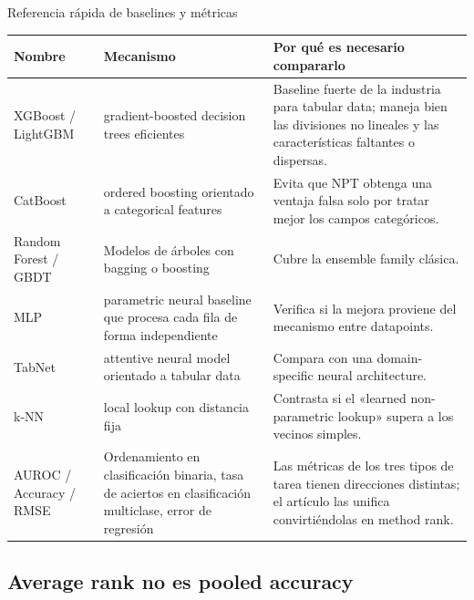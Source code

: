 \documentclass[a4paper]{article}
\begin{document}
\begin{knowledgebox}{Referencia rápida de baselines y métricas}
\begin{tabularx}{\textwidth}{L{0.19\textwidth}L{0.25\textwidth}>{\raggedright\arraybackslash}X}
\toprule
Nombre & Mecanismo & Por qué es necesario compararlo \\
\midrule
XGBoost / LightGBM & gradient-boosted decision trees eficientes & Baseline fuerte de la industria para tabular data; maneja bien las divisiones no lineales y las características faltantes o dispersas. \\
CatBoost & ordered boosting orientado a categorical features & Evita que NPT obtenga una ventaja falsa solo por tratar mejor los campos categóricos. \\
Random Forest / GBDT & Modelos de árboles con bagging o boosting & Cubre la ensemble family clásica. \\
MLP & parametric neural baseline que procesa cada fila de forma independiente & Verifica si la mejora proviene del mecanismo entre datapoints. \\
TabNet & attentive neural model orientado a tabular data & Compara con una domain-specific neural architecture. \\
k-NN & local lookup con distancia fija & Contrasta si el «learned non-parametric lookup» supera a los vecinos simples. \\
AUROC / Accuracy / RMSE & Ordenamiento en clasificación binaria, tasa de aciertos en clasificación multiclase, error de regresión & Las métricas de los tres tipos de tarea tienen direcciones distintas; el artículo las unifica convirtiéndolas en method rank. \\
\bottomrule
\end{tabularx}
\end{knowledgebox}



\subsection{Average rank no es pooled accuracy}
\end{document}
